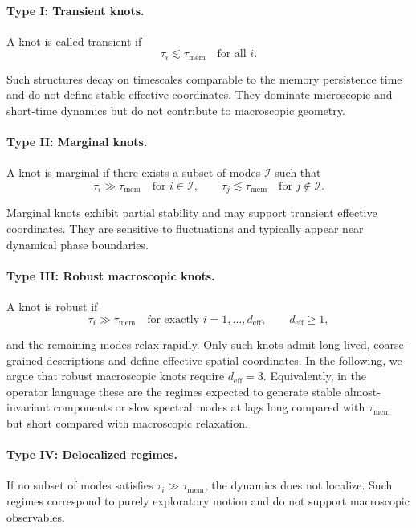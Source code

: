 \documentclass[reprint,amsmath,amssymb,aps,prl,nofootinbib,floatfix]{revtex4-2}
\begin{document}
\paragraph{Type I: Transient knots.}
A knot is called transient if
\begin{equation}
\tau_i \lesssim \tau_{\mathrm{mem}}
\quad\text{for all } i.
\end{equation}

Such structures decay on timescales comparable to the memory persistence time and do not define stable effective coordinates.
They dominate microscopic and short-time dynamics but do not contribute to macroscopic geometry.

\paragraph{Type II: Marginal knots.}
A knot is marginal if there exists a subset of modes $\mathcal{I}$ such that
\begin{equation}
\tau_i \gg \tau_{\mathrm{mem}}
\quad\text{for } i\in\mathcal{I},
\qquad
\tau_j \lesssim \tau_{\mathrm{mem}}
\quad\text{for } j\notin\mathcal{I}.
\end{equation}

Marginal knots exhibit partial stability and may support transient effective coordinates.
They are sensitive to fluctuations and typically appear near dynamical phase boundaries.

\paragraph{Type III: Robust macroscopic knots.}
A knot is robust if
\begin{equation}
\tau_i \gg \tau_{\mathrm{mem}}
\quad\text{for exactly } i=1,\dots,d_{\mathrm{eff}},
\qquad
d_{\mathrm{eff}}\ge 1,
\end{equation}

and the remaining modes relax rapidly.
Only such knots admit long-lived, coarse-grained descriptions and define effective spatial coordinates.
In the following, we argue that robust macroscopic knots require $d_{\mathrm{eff}}=3$.
Equivalently, in the operator language these are the regimes expected to generate stable almost-invariant components or slow spectral modes at lags long compared with $\tau_{\mathrm{mem}}$ but short compared with macroscopic relaxation.

\paragraph{Type IV: Delocalized regimes.}
If no subset of modes satisfies $\tau_i\gg\tau_{\mathrm{mem}}$, the dynamics does not localize.
Such regimes correspond to purely exploratory motion and do not support macroscopic observables.
\end{document}
